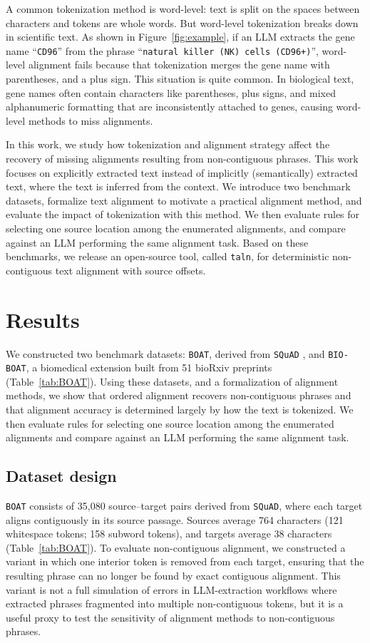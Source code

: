 \documentclass[10pt,twocolumn]{article}
\theoremstyle{plain}
\theoremstyle{definition}
\theoremstyle{remark}
\begin{document}
A common tokenization method is word-level: text is split on the spaces between characters and tokens are whole words. But word-level tokenization breaks down in scientific text. As shown in Figure~\ref{fig:example}, if an LLM extracts the gene name ``\texttt{CD96}'' from the phrase ``\texttt{natural killer (NK) cells (CD96+)}'', word-level alignment fails because that tokenization merges the gene name with parentheses, and a plus sign. This situation is quite common. In biological text, gene names often contain characters like parentheses, plus signs, and mixed alphanumeric formatting that are inconsistently attached to genes, causing word-level methods to miss alignments.

In this work, we study how tokenization and alignment strategy affect the recovery of missing alignments resulting from non-contiguous phrases. This work focuses on explicitly extracted text instead of implicitly (semantically) extracted text, where the text is inferred from the context. We introduce two benchmark datasets, formalize text alignment to motivate a practical alignment method, and evaluate the impact of tokenization with this method. We then evaluate rules for selecting one source location among the enumerated alignments, and compare against an LLM performing the same alignment task. Based on these benchmarks, we release an open-source tool, called \texttt{taln}, for deterministic non-contiguous text alignment with source offsets.

\section{Results}
We constructed two benchmark datasets: \texttt{BOAT}, derived from \texttt{SQuAD} \citep{rajpurkar2016squad100000questionsmachine, rajpurkar2018knowdontknowunanswerable}, and \texttt{BIO-BOAT}, a biomedical extension built from 51 bioRxiv preprints (Table~\ref{tab:BOAT}). Using these datasets, and a formalization of alignment methods, we show that ordered alignment recovers non-contiguous phrases and that alignment accuracy is determined largely by how the text is tokenized. We then evaluate rules for selecting one source location among the enumerated alignments and compare against an LLM performing the same alignment task.

\subsection{Dataset design}
\texttt{BOAT} consists of 35{,}080 source–target pairs derived from \texttt{SQuAD}, where each target aligns contiguously in its source passage. Sources average 764 characters (121 whitespace tokens; 158 subword tokens), and targets average 38 characters (Table~\ref{tab:BOAT}). To evaluate non-contiguous alignment, we constructed a variant in which one interior token is removed from each target, ensuring that the resulting phrase can no longer be found by exact contiguous alignment. This variant is not a full simulation of errors in LLM-extraction workflows where extracted phrases fragmented into multiple non-contiguous tokens, but it is a useful proxy to test the sensitivity of alignment methods to non-contiguous phrases.
\end{document}

